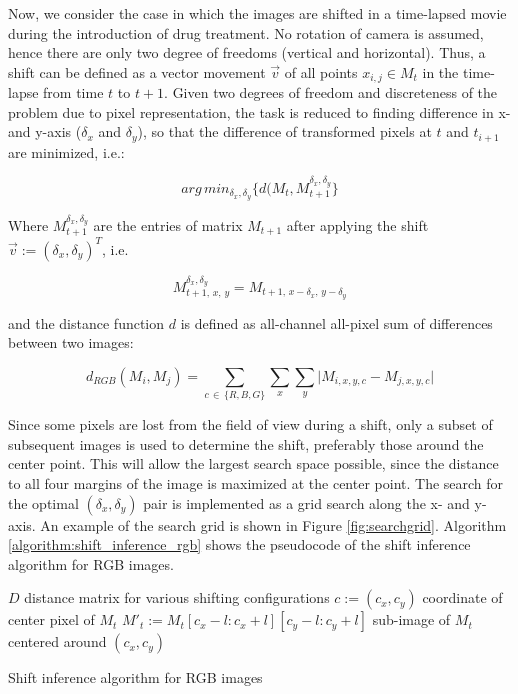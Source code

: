 \documentclass[pdftex,12pt,a4paper]{report}
\begin{document}
Now, we consider the case in which the images are shifted in a time-lapsed movie during the introduction of drug treatment. No rotation of camera is assumed, hence there are only two degree of freedoms (vertical and horizontal). Thus, a shift can be defined as a vector movement $\vec{v}$ of all points $x_{i,j} \in M_t$ in the time-lapse from time $t$ to $t + 1$. Given two degrees of freedom and discreteness of the problem due to pixel representation, the task is reduced to finding difference in x- and y-axis ($\delta_x$ and $\delta_y$), so that the difference of transformed pixels at $t$ and $t_{i+1}$ are minimized, i.e.:

$$
arg\,min_{\delta_x, \delta_y} \{d(M_{t}, M_{t + 1}^{\delta_x, \delta_y}\}
$$

Where $M_{t + 1}^{\delta_x, \delta_y}$ are the entries of matrix $M_{t + 1}$ after applying the shift $\vec{v} := (\delta_x, \delta_y)^T$, i.e.

$$M_{t + 1, \, x, \, y}^{\delta_x, \delta_y} = M_{t + 1, \, x - \delta_x, \, y - \delta_y}$$

and the distance function $d$ is defined as all-channel all-pixel sum of differences between two images:

$$
d_{RGB}(M_i, M_j) = \sum_{c \, \in \, \{R, B, G\}} \sum_{x} \sum_{y} \vert M_{i, x, y, c} - M_{j, x, y, c} \vert
$$

Since some pixels are lost from the field of view during a shift, only a subset of subsequent images is used to determine the shift, preferably those around the center point. This will allow the largest search space possible, since the distance to all four margins of the image is maximized at the center point. The search for the optimal $(\delta_x, \delta_y)$ pair is implemented as a grid search along the x- and y-axis. An example of the search grid is shown in Figure \ref{fig:searchgrid}. Algorithm \ref{algorithm:shift_inference_rgb} shows the pseudocode of the  shift inference algorithm for RGB images.

\vspace{10mm}

\begin{algorithm}[H]
 $D$ distance matrix for various shifting configurations \;
 $c := (c_x, c_y)$ coordinate of center pixel of $M_t$ \;
 $M'_t  := M_{t}[c_x - l:c_x +l][c_y - l:c_y +l]$ sub-image of $M_t$ centered around $(c_x, c _y)$\;
 \vline
\caption{Shift inference algorithm for RGB images}
\label{algorithm:shift_inference_rgb}
\end{algorithm}
\end{document}
